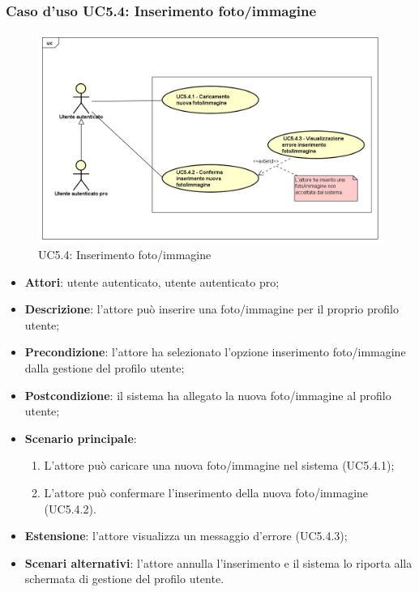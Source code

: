 \subsubsection{Caso d'uso UC5.4: Inserimento foto/immagine}
\label{UC5.4}
\begin{figure}[h]
	\centering
	\includegraphics[scale=0.5,keepaspectratio]{UML/UC5_4.png}
	\caption{UC5.4: Inserimento foto/immagine}
\end{figure}
\begin{itemize}
	\item \textbf{Attori}: utente autenticato, utente autenticato pro;
	\item \textbf{Descrizione}: l'attore può inserire una foto/immagine per il proprio profilo utente;
	\item \textbf{Precondizione}: l'attore ha selezionato l'opzione inserimento foto/immagine dalla gestione del profilo utente; 
	\item \textbf{Postcondizione}: il sistema ha allegato la nuova foto/immagine al profilo utente;
	\item \textbf{Scenario principale}:
	\begin{enumerate}
		\item L'attore può caricare una nuova foto/immagine nel sistema (UC5.4.1);
		\item L'attore può confermare l'inserimento della nuova foto/immagine (UC5.4.2).
	\end{enumerate}
	\item \textbf{Estensione}: l'attore visualizza un messaggio d'errore (UC5.4.3);
	\item \textbf{Scenari alternativi}: l'attore annulla l'inserimento e il sistema lo riporta alla schermata di gestione del profilo utente.
\end{itemize}

